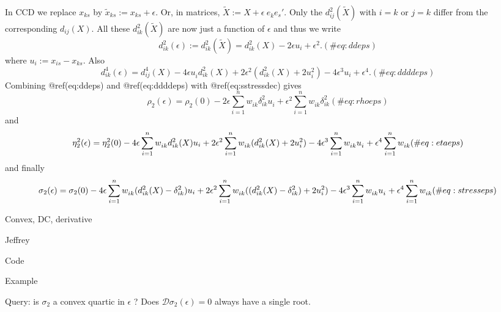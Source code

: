 \documentclass[
  12pt,
  letterpaper,
  DIV=11,
  numbers=noendperiod]{scrreprt}
\theoremstyle{remark}
\begin{document}
In CCD we replace \(x_{ks}\) by \(\tilde x_{ks}:=x_{ks}+\epsilon\). Or,
in matrices, \(\tilde X:=X+\epsilon\ e_k^{\ }e_s'\). Only the
\(d_{ij}^2(\tilde X)\) with \(i=k\) or \(j=k\) differ from the
corresponding \(d_{ij}(X)\). All these \(d_{ik}^2(\tilde X)\) are now
just a function of \(\epsilon\) and thus we write \begin{equation}
d_{ik}^2(\epsilon):=d_{ik}^2(\tilde X)=d_{ik}^2(X)-2\epsilon u_i+\epsilon^2.
(\#eq:ddeps)
\end{equation} where \(u_i:=x_{is}-x_{ks}\). Also \begin{equation}
d_{ik}^4(\epsilon)=d_{ij}^4(X)-4\epsilon u_i^{\ }d_{ik}^2(X)+2\epsilon^2(d_{ik}^2(X)+2 u_i^2)-4\epsilon^3u_i+\epsilon^4.
(\#eq:ddddeps)
\end{equation} Combining @ref(eq:ddeps) and @ref(eq:ddddeps) with
@ref(eq:sstressdec) gives \begin{equation}
\rho_2(\epsilon)=\rho_2(0)-2\epsilon\sum_{i=1}^n w_{ik}^{\ }\delta_{ik}^2u_i^{\ }+\epsilon^2\sum_{i=1}^n w_{ik}^{\ }\delta_{ik}^2
(\#eq:rhoeps)
\end{equation} and \begin{equation}
\eta^2_2(\epsilon)=\eta_2^2(0)-4\epsilon\sum_{i=1}^nw_{ik}^{\ }d_{ik}^2(X)u_i+2\epsilon^2\sum_{i=1}^nw_{ik}^{\ }(d_{ik}^2(X)+2u_i^2)-\\
4\epsilon^{3}\sum_{i=1}^nw_{ik}^{\ }u_i^{\ }+\epsilon^4\sum_{i=1}^nw_{ik}^{\ }
(\#eq:etaeps)
\end{equation} and finally \begin{equation}
\sigma_2(\epsilon)=\sigma_2(0)-4\epsilon\sum_{i=1}^nw_{ik}^{\ }(d_{ik}^2(X)-\delta_{ik}^2)u_i+2\epsilon^2\sum_{i=1}^nw_{ik}^{\ }((d_{ik}^2(X)-\delta_{ik}^2)+2u_i^2)-\\
4\epsilon^{3}\sum_{i=1}^nw_{ik}^{\ }u_i^{\ }+\epsilon^4\sum_{i=1}^nw_{ik}^{\ }
(\#eq:stresseps)
\end{equation}

Convex, DC, derivative

Jeffrey

Code

Example

Query: is \(\sigma_2\) a convex quartic in \(\epsilon\) ? Does
\(\mathcal{D}\sigma_2(\epsilon )=0\) always have a single root.
\end{document}
